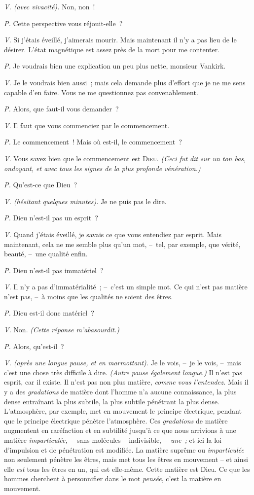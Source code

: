 \documentclass[french,twoside]{book} %
\begin{document}
\emph{V. (avec vivacité).} Non, non !\par
\emph{P.} Cette perspective vous réjouit-elle ?\par
\emph{V.} Si j’étais éveillé, j’aimerais mourir. Mais maintenant il n’y a pas lieu de le désirer. L’état magnétique est assez près de la mort pour me contenter.\par
\emph{P.} Je voudrais bien une explication un peu plus nette, monsieur Vankirk.\par
\emph{V.} Je le voudrais bien aussi ; mais cela demande plus d’effort que je ne me sens capable d’en faire. Vous ne me questionnez pas convenablement.\par
\emph{P.} Alors, que faut-il vous demander ?\par
\emph{V.} Il faut que vous commenciez par le commencement.\par
\emph{P.} Le commencement ! Mais où est-il, le commencement ?\par
\emph{V.} Vous savez bien que le commencement est {\scshape Dieu}. \emph{(Ceci fut dit sur un ton bas, ondoyant, et avec tous les signes de la plus profonde vénération.)}\par
\emph{P.} Qu’est-ce que Dieu ?\par
\emph{V. (hésitant quelques minutes).} Je ne puis pas le dire.\par
\emph{P.} Dieu n’est-il pas un esprit ?\par
\emph{V.} Quand j’étais éveillé, je savais ce que vous entendiez par esprit. Mais maintenant, cela ne me semble plus qu’un mot, – tel, par exemple, que vérité, beauté, – une qualité enfin.\par
\emph{P.} Dieu n’est-il pas immatériel ?\par
\emph{V.} Il n’y a pas d’immatérialité ; – c’est un simple mot. Ce qui n’est pas matière n’est pas, – à moins que les qualités ne soient des êtres.\par
\emph{P.} Dieu est-il donc matériel ?\par
\emph{V.} Non. \emph{(Cette réponse m’abasourdit.)}\par
\emph{P.} Alors, qu’est-il ?\par
\emph{V. (après une longue pause, et en marmottant).} Je le vois, – je le vois, – mais c’est une chose très difficile à dire. \emph{(Autre pause également longue.)} Il n’est pas esprit, car il existe. Il n’est pas non plus matière, \emph{comme vous l’entendez.} Mais il y a des \emph{gradations} de matière dont l’homme n’a aucune connaissance, la plus dense entraînant la plus subtile, la plus subtile pénétrant la plus dense. L’atmosphère, par exemple, met en mouvement le principe électrique, pendant que le principe électrique pénètre l’atmosphère. Ces \emph{gradations} de matière augmentent en raréfaction et en subtilité jusqu’à ce que nous arrivions à une matière \emph{imparticulée, –} sans molécules – indivisible, – \emph{une ;} et ici la loi d’impulsion et de pénétration est modifiée. La matière suprême ou \emph{imparticulée} non seulement pénètre les êtres, mais met tous les êtres en mouvement – et ainsi elle \emph{est} tous les êtres en un, qui est elle-même. Cette matière est Dieu. Ce que les hommes cherchent à personnifier dans le mot \emph{pensée}, c’est la matière en mouvement.\par
\end{document}
